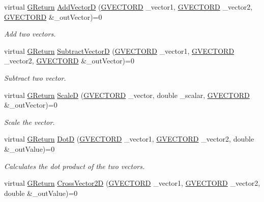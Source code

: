 \begin{DoxyCompactItemize}
virtual \hyperlink{namespaceGW_a67a839e3df7ea8a5c5686613a7a3de21}{G\+Return} \hyperlink{classGW_1_1MATH_1_1GVector_a3c795ce49b0b71dc83528e3b89a1b1ff}{Add\+VectorD} (\hyperlink{structGW_1_1MATH_1_1GVECTORD}{G\+V\+E\+C\+T\+O\+RD} \+\_\+vector1, \hyperlink{structGW_1_1MATH_1_1GVECTORD}{G\+V\+E\+C\+T\+O\+RD} \+\_\+vector2, \hyperlink{structGW_1_1MATH_1_1GVECTORD}{G\+V\+E\+C\+T\+O\+RD} \&\+\_\+out\+Vector)=0
\begin{DoxyCompactList}\small\item\em Add two vectors. \end{DoxyCompactList}\item 
virtual \hyperlink{namespaceGW_a67a839e3df7ea8a5c5686613a7a3de21}{G\+Return} \hyperlink{classGW_1_1MATH_1_1GVector_ae060722225a95e48c83c9c4adead93e0}{Subtract\+VectorD} (\hyperlink{structGW_1_1MATH_1_1GVECTORD}{G\+V\+E\+C\+T\+O\+RD} \+\_\+vector1, \hyperlink{structGW_1_1MATH_1_1GVECTORD}{G\+V\+E\+C\+T\+O\+RD} \+\_\+vector2, \hyperlink{structGW_1_1MATH_1_1GVECTORD}{G\+V\+E\+C\+T\+O\+RD} \&\+\_\+out\+Vector)=0
\begin{DoxyCompactList}\small\item\em Subtract two vector. \end{DoxyCompactList}\item 
virtual \hyperlink{namespaceGW_a67a839e3df7ea8a5c5686613a7a3de21}{G\+Return} \hyperlink{classGW_1_1MATH_1_1GVector_a43e69ae3ed90a6ade1d6137409766fbe}{ScaleD} (\hyperlink{structGW_1_1MATH_1_1GVECTORD}{G\+V\+E\+C\+T\+O\+RD} \+\_\+vector, double \+\_\+scalar, \hyperlink{structGW_1_1MATH_1_1GVECTORD}{G\+V\+E\+C\+T\+O\+RD} \&\+\_\+out\+Vector)=0
\begin{DoxyCompactList}\small\item\em Scale the vector. \end{DoxyCompactList}\item 
virtual \hyperlink{namespaceGW_a67a839e3df7ea8a5c5686613a7a3de21}{G\+Return} \hyperlink{classGW_1_1MATH_1_1GVector_ad159973274edb5ded88a21f2e196c3ab}{DotD} (\hyperlink{structGW_1_1MATH_1_1GVECTORD}{G\+V\+E\+C\+T\+O\+RD} \+\_\+vector1, \hyperlink{structGW_1_1MATH_1_1GVECTORD}{G\+V\+E\+C\+T\+O\+RD} \+\_\+vector2, double \&\+\_\+out\+Value)=0
\begin{DoxyCompactList}\small\item\em Calculates the dot product of the two vectors. \end{DoxyCompactList}\item 
virtual \hyperlink{namespaceGW_a67a839e3df7ea8a5c5686613a7a3de21}{G\+Return} \hyperlink{classGW_1_1MATH_1_1GVector_a96ef18a518dfbdbda5727e7799844b15}{Cross\+Vector2D} (\hyperlink{structGW_1_1MATH_1_1GVECTORD}{G\+V\+E\+C\+T\+O\+RD} \+\_\+vector1, \hyperlink{structGW_1_1MATH_1_1GVECTORD}{G\+V\+E\+C\+T\+O\+RD} \+\_\+vector2, double \&\+\_\+out\+Value)=0

\end{DoxyCompactItemize}
